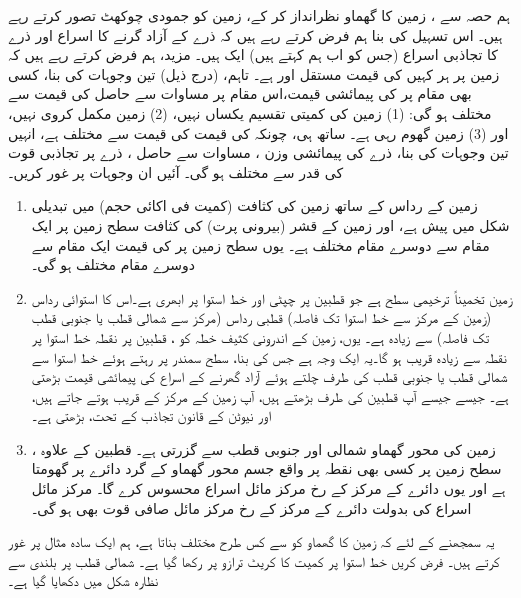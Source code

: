 ہم حصہ  سے ، زمین  کا گھماو نظرانداز کر کے،  زمین  کو جمودی چوکھٹ  تصور کرتے رہے ہیں۔ اس تسہیل  کی بنا  ہم  فرض  کرتے  رہے ہیں  کہ  ذرے کے  آزاد گرنے  کا اسراع   اور ذرے کا تجاذبی اسراع (جس کو اب ہم  کہتے ہیں)   ایک  ہیں۔ مزید، ہم فرض کرتے رہے ہیں کہ زمین پر ہر کہیں  کی قیمت مستقل اور   ہے۔ تاہم،   (درج ذیل) تین وجوہات کی بنا، کسی بھی مقام پر  کی پیمائشی قیمت،اس مقام پر  مساوات  سے حاصل   کی قیمت سے مختلف ہو گی: (1)  زمین کی کمیتی تقسیم یکساں نہیں، (2) زمین مکمل کروی نہیں، اور (3)  زمین گھوم رہی ہے۔ ساتھ ہی، چونکہ   کی قیمت  کی قیمت سے مختلف ہے، انہیں تین وجوہات کی بنا،  ذرے کی پیمائشی وزن  ، مساوات  سے حاصل ، ذرے پر تجاذبی قوت کی قدر سے مختلف ہو گی۔ آئیں ان وجوہات پر غور کریں۔

\begin{enumerate}[1.]
\item
{}  زمین کے رداس کے ساتھ زمین  کی کثافت (کمیت فی اکائی حجم)     میں تبدیلی شکل  میں پیش ہے، اور  زمین کے قشر  (بیرونی پرت) کی کثافت   سطح زمین پر ایک مقام سے دوسرے مقام  مختلف ہے۔ یوں سطح زمین پر  کی قیمت ایک مقام سے دوسرے مقام مختلف ہو گی۔
\item
{} زمین  تخمیناً   ترخیمی سطح ہے جو  قطبین پر   چپٹی   اور   خط استوا پر  ابھری ہے۔اس کا استوائی رداس  (زمین کے مرکز سے خط استوا تک فاصلہ) قطبی رداس (مرکز سے شمالی قطب یا جنوبی قطب تک فاصلہ)  سے    زیادہ ہے۔ یوں، زمین کے  اندرونی کثیف  خطہ کو  ،  قطبین پر نقطہ  خط استوا  پر نقطہ    سے زیادہ قریب ہو گا۔یہ ایک وجہ ہے جس کی بنا، سطح سمندر پر  رہتے ہوئے خط استوا سے شمالی قطب  یا جنوبی قطب  کی طرف چلتے ہوئے آزاد گھرنے  کے اسراع   کی پیمائشی قیمت بڑھتی ہے۔ جیسے جیسے آپ قطبین کی طرف بڑھتے ہیں، آپ  زمین کے مرکز کے قریب ہوتے جاتے ہیں، اور نیوٹن کے قانون تجاذب کے تحت،  بڑھتی ہے۔
\item
{}   زمین کی  محور گھماو  شمالی اور جنوبی قطب سے گزرتی ہے۔ قطبین کے علاوہ ، سطح زمین پر کسی بھی نقطہ پر   واقع جسم محور گھماو کے گرد  دائرے پر گھومتا ہے اور یوں  دائرے کے مرکز  کے رخ   مرکز مائل اسراع محسوس کرے گا۔ مرکز مائل اسراع کی بدولت  دائرے کے مرکز کے رخ مرکز مائل صافی قوت بھی ہو گی۔
\end{enumerate}

یہ سمجھنے کے لئے  کہ زمین کا گھماو  کو  سے کس طرح مختلف بناتا ہے، ہم ایک سادہ مثال پر غور کرتے ہیں۔ فرض کریں خط استوا پر کمیت  کا کریٹ  ترازو پر رکھا گیا ہے۔   شمالی قطب پر بلندی سے نظارہ  شکل  میں دکھایا گیا ہے۔

